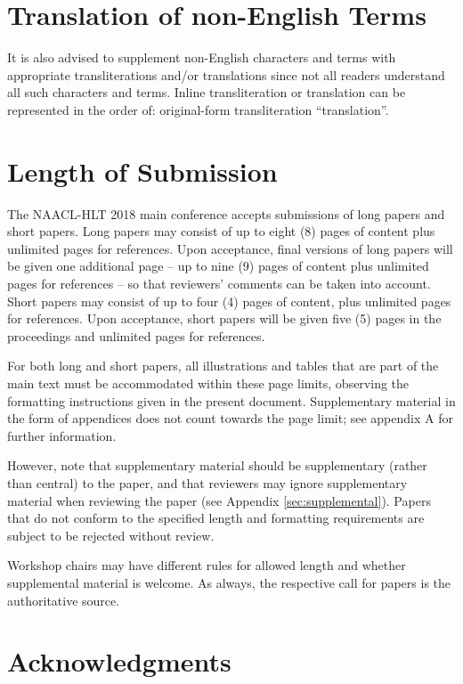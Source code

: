 \documentclass[11pt,a4paper]{article}
\begin{document}
\section{Translation of non-English Terms}

It is also advised to supplement non-English characters and terms
with appropriate transliterations and/or translations
since not all readers understand all such characters and terms.
Inline transliteration or translation can be represented in
the order of: original-form transliteration ``translation''.

\section{Length of Submission}
\label{sec:length}

The NAACL-HLT 2018 main conference accepts submissions of long papers and
short papers.
 Long papers may consist of up to eight (8) pages of
content plus unlimited pages for references. Upon acceptance, final
versions of long papers will be given one additional page -- up to nine (9)
pages of content plus unlimited pages for references -- so that reviewers' comments
can be taken into account. Short papers may consist of up to four (4)
pages of content, plus unlimited pages for references. Upon
acceptance, short papers will be given five (5) pages in the
proceedings and unlimited pages for references. 

For both long and short papers, all illustrations and tables that are part
of the main text must be accommodated within these page limits, observing
the formatting instructions given in the present document. Supplementary
material in the form of appendices does not count towards the page limit; see appendix A for further information.

However, note that supplementary material should be supplementary
(rather than central) to the paper, and that reviewers may ignore
supplementary material when reviewing the paper (see Appendix
\ref{sec:supplemental}). Papers that do not conform to the specified
length and formatting requirements are subject to be rejected without
review.

Workshop chairs may have different rules for allowed length and
whether supplemental material is welcome. As always, the respective
call for papers is the authoritative source.

\section*{Acknowledgments}
\end{document}
